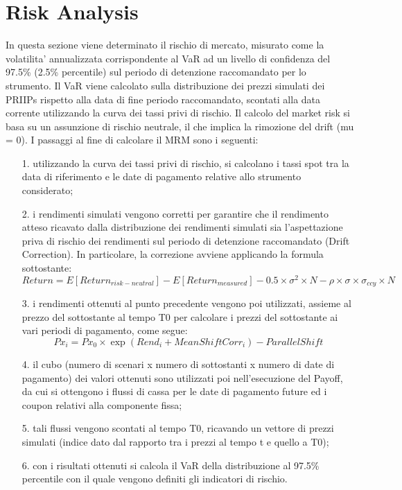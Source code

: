 \documentclass[11pt,fleqn]{extarticle}
\begin{document}
\section{Risk Analysis}
In questa sezione viene determinato il rischio di mercato, misurato come la volatilita' annualizzata corrispondente al VaR ad un livello di confidenza del 97.5\% (2.5\% percentile) sul periodo di detenzione raccomandato per lo strumento. Il VaR viene calcolato sulla distribuzione dei prezzi simulati dei PRIIPs rispetto alla data di fine periodo raccomandato, scontati alla data corrente utilizzando la curva dei tassi privi di rischio.\newline
Il calcolo del market risk si basa su un assunzione di rischio neutrale, il che implica la rimozione del drift (mu = 0). I passaggi al fine di calcolare il MRM sono i seguenti:
\begin{itemize}
\setlength\itemsep{-0.1em}
\item[1.] utilizzando la curva dei tassi privi di rischio, si calcolano i tassi spot tra la data di riferimento e le date di pagamento relative allo strumento considerato;
\item[2.] i rendimenti simulati vengono corretti per garantire che il rendimento atteso ricavato dalla distribuzione dei rendimenti simulati sia l'aspettazione priva di rischio dei rendimenti sul periodo di detenzione raccomandato (Drift Correction). In particolare, la correzione avviene applicando la formula sottostante:
\begin{equation}
Return = E[Return_{risk-neutral}] - E[Return_{measured}] - 0.5\times \sigma^2 \times N - \rho \times \sigma \times \sigma_{ccy} \times N
\end{equation}
\item[3.] i rendimenti ottenuti al punto precedente vengono poi utilizzati, assieme al prezzo del sottostante al tempo T0 per calcolare i prezzi del sottostante ai vari periodi di pagamento, come segue:
\begin{equation}
Px_i = Px_0 \times \exp(Rend_i + MeanShiftCorr_i) - ParallelShift
\end{equation}
\item[4.] il cubo (numero di scenari x numero di sottostanti x numero di date di pagamento) dei valori ottenuti sono utilizzati poi nell'esecuzione del Payoff, da cui si ottengono i flussi di cassa per le date di pagamento future ed i coupon relativi alla componente fissa;
\item[5.] tali flussi vengono scontati al tempo T0, ricavando un vettore di prezzi simulati (indice dato dal rapporto tra i prezzi al tempo t e quello a T0);
\item[6.] con i risultati ottenuti si calcola il VaR della distribuzione al 97.5\% percentile con il quale vengono definiti gli indicatori di rischio.
\end{itemize}
\end{document}
